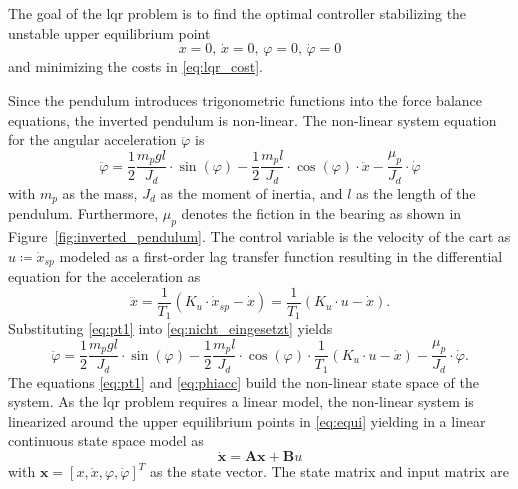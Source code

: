 \newpage
The goal of the \gls{lqr} problem is to find the optimal controller stabilizing the unstable upper equilibrium point
\begin{equation}
    x = 0,\, \dot{x} = 0,\, \varphi = 0,\, \dot{\varphi} = 0
    \label{eq:equi}
\end{equation}
and minimizing the costs in \eqref{eq:lqr_cost}.

Since the pendulum introduces trigonometric functions into the force balance equations, the inverted pendulum is non-linear. The non-linear system equation for the angular acceleration $\ddot{\varphi}$ is
\begin{equation}
    \ddot{\varphi}=\frac{1}{2}\frac{m_p g l}{J_d} \cdot \sin(\varphi)-\frac{1}{2}\frac{m_p l}{J_d}\cdot \cos(\varphi)\cdot\ddot{x}-\frac{\mu_p}{J_d}\cdot\dot{\varphi}
    \label{eq:nicht_eingesetzt}
\end{equation}
with $m_p$ as the mass, $J_d$ as the moment of inertia, and $l$ as the length of the pendulum. Furthermore, $\mu_p$ denotes the fiction in the bearing as shown in Figure~\ref{fig:inverted_pendulum}.
The control variable is the velocity of the cart as $u \coloneqq \dot{x}_{sp}$ modeled as a first-order lag transfer function resulting in the differential equation for the acceleration as
\begin{equation}
    \ddot{x}= \frac{1}{T_1}(K_u\cdot \dot{x}_{sp}-\dot{x})=\frac{1}{T_1}(K_u \cdot u-\dot{x}).
    \label{eq:pt1}
\end{equation}
Substituting \eqref{eq:pt1} into \eqref{eq:nicht_eingesetzt} yields
\begin{equation}
    \ddot{\varphi}=\frac{1}{2}\frac{m_p g l}{J_d} \cdot \sin(\varphi)-\frac{1}{2}\frac{m_p l}{J_d} \cdot \cos(\varphi) \cdot \frac{1}{T_1}(K_u\cdot u-\dot{x})-\frac{\mu_p}{J_d}\cdot\dot{\varphi}.
    \label{eq:phiacc}
\end{equation}
The equations \eqref{eq:pt1} and \eqref{eq:phiacc} build the non-linear state space of the system. As the \gls{lqr} problem requires a linear model, the non-linear system is linearized around the upper equilibrium points in \eqref{eq:equi} yielding in a linear continuous state space model as
\begin{equation}
    \dot{\mathbf{x}} = \mathbf{A} \mathbf{x} + \mathbf{B} u
    \label{eq:cont_state_space}
\end{equation}
with $\mathbf{x} = [x, \dot{x}, \varphi, \dot{\varphi}]^T$ as the state vector. The state matrix and input matrix are 
